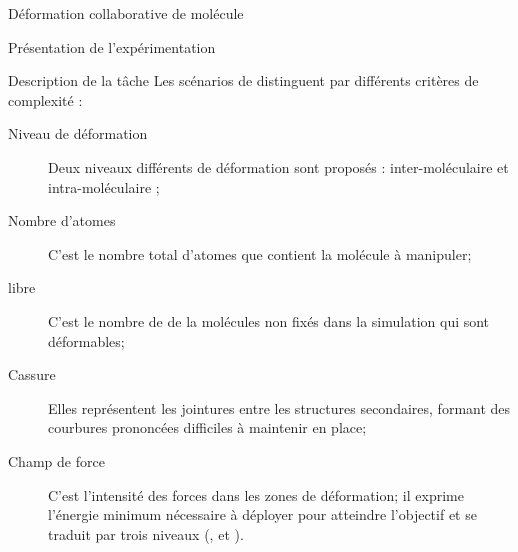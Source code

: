 \documentclass[myfrancais,ngerman,english,french]{mythesis}
\begin{document}
\begin{mychapter}{Déformation collaborative de molécule}
\begin{mysection}{Présentation de l'expérimentation}
\begin{mysubsection}{Description de la tâche}
				Les scénarios de distinguent par différents critères de complexité :
				\begin{description}
					\item[Niveau de déformation] Deux niveaux différents de déformation sont proposés : inter-moléculaire et intra-moléculaire ;
					\item[Nombre d'atomes] C'est le nombre total d'atomes que contient la molécule à manipuler;
					\item[ libre] C'est le nombre de  de la molécules non fixés dans la simulation qui sont déformables;
					\item[Cassure] Elles représentent les jointures entre les structures secondaires, formant des courbures prononcées difficiles à maintenir en place;
					\item[Champ de force] C'est l'intensité des forces dans les zones de déformation; il exprime l'énergie minimum nécessaire à déployer pour atteindre l'objectif et se traduit par trois niveaux (,  et ).
				\end{description}


\end{mysubsection}
\end{mysection}
\end{mychapter}
\end{document}
